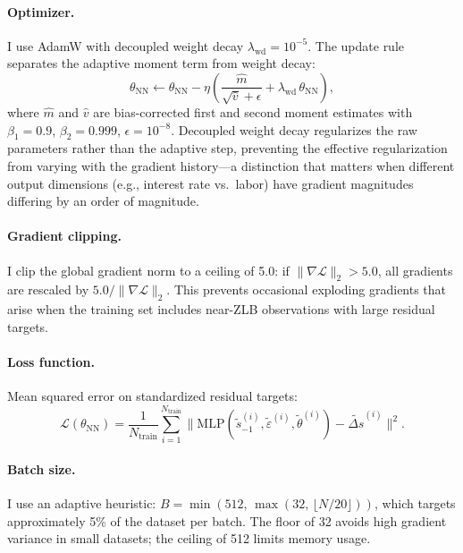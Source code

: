 \documentclass[12pt]{article}
\theoremstyle{plain}
\theoremstyle{definition}
\theoremstyle{remark}
\newcommand{\eps}{\varepsilon}
\begin{document}
\paragraph{Optimizer.} I use AdamW \citep{loshchilov2019decoupled} with decoupled weight decay $\lambda_{\text{wd}} = 10^{-5}$. The update rule separates the adaptive moment term from weight decay:
\begin{equation}
\theta_{\text{NN}} \leftarrow \theta_{\text{NN}} - \eta\!\left(\frac{\hat{m}}{\sqrt{\hat{v}} + \epsilon} + \lambda_{\text{wd}}\,\theta_{\text{NN}}\right),
\end{equation}
where $\hat{m}$ and $\hat{v}$ are bias-corrected first and second moment estimates with $\beta_1 = 0.9$, $\beta_2 = 0.999$, $\epsilon = 10^{-8}$. Decoupled weight decay regularizes the raw parameters rather than the adaptive step, preventing the effective regularization from varying with the gradient history---a distinction that matters when different output dimensions (e.g., interest rate vs.\ labor) have gradient magnitudes differing by an order of magnitude.

\paragraph{Gradient clipping.} I clip the global gradient norm to a ceiling of 5.0: if $\|\nabla\mathcal{L}\|_2 > 5.0$, all gradients are rescaled by $5.0 / \|\nabla\mathcal{L}\|_2$. This prevents occasional exploding gradients that arise when the training set includes near-ZLB observations with large residual targets.

\paragraph{Loss function.} Mean squared error on standardized residual targets:
\begin{equation}
\mathcal{L}(\theta_{\text{NN}}) = \frac{1}{N_{\text{train}}} \sum_{i=1}^{N_{\text{train}}} \|\text{MLP}(\tilde{s}_{-1}^{(i)}, \tilde{\eps}^{(i)}, \tilde{\theta}^{(i)}) - \widetilde{\Delta s}^{(i)}\|^2.
\end{equation}

\paragraph{Batch size.} I use an adaptive heuristic: $B = \min(512,\, \max(32,\, \lfloor N/20 \rfloor))$, which targets approximately 5\% of the dataset per batch. The floor of 32 avoids high gradient variance in small datasets; the ceiling of 512 limits memory usage.
\end{document}
